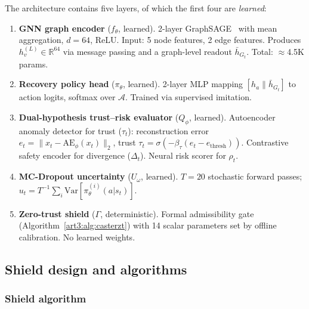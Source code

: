 The architecture contains five layers, of which the first four are \emph{learned}:
\begin{enumerate}
    \item \textbf{GNN graph encoder} ($f_\theta$, learned).
    2-layer GraphSAGE~\cite{hamilton2017graphsage} with mean aggregation, $d=64$, ReLU.  Input: 5 node features, 2 edge features.  Produces $h_v^{(L)} \in \mathbb{R}^{64}$ via message passing and a graph-level readout $\bar{h}_{G_t}$.  Total: $\approx$4.5K params.
    \item \textbf{Recovery policy head} ($\pi_\theta$, learned).
    2-layer MLP mapping $[h_a \| \bar{h}_{G_t}]$ to action logits, softmax over $\mathcal{A}$.  Trained via supervised imitation.
    \item \textbf{Dual-hypothesis trust--risk evaluator} ($Q_\phi$, learned).
    Autoencoder anomaly detector for trust ($\tau_t$): reconstruction error $e_t = \|x_t - \mathrm{AE}_\phi(x_t)\|_2$, trust $\tau_t = \sigma(-\beta_\tau(e_t - e_{\mathrm{thresh}}))$.
    Contrastive safety encoder for divergence ($\Delta_t$).
    Neural risk scorer for $\rho_t$.
    \item \textbf{MC-Dropout uncertainty} ($U_\omega$, learned).
    $T=20$ stochastic forward passes; $u_t = T^{-1}\sum_i \mathrm{Var}[\pi_\theta^{(i)}(a|s_t)]$.
    \item \textbf{Zero-trust shield} ($\Gamma$, deterministic).
    Formal admissibility gate (Algorithm~\ref{art3:alg:casterzt}) with 14 scalar parameters set by offline calibration.  No learned weights.
\end{enumerate}


\subsection{Shield design and algorithms}

\subsubsection{Shield algorithm}

